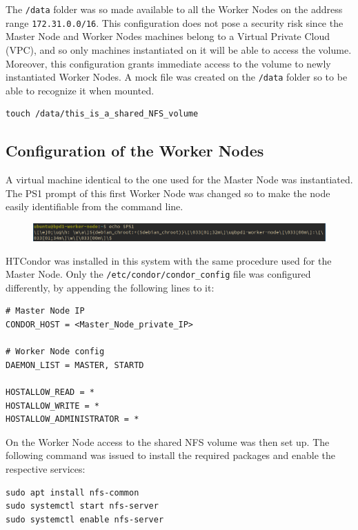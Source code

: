\documentclass{article}
\begin{document}
The \texttt{/data} folder was so made available to all the Worker Nodes on the address range \texttt{172.31.0.0/16}.
This configuration does not pose a security risk since the Master Node and Worker Nodes machines belong to a Virtual Private Cloud (VPC), and so only machines instantiated on it will be able to access the volume.
Moreover, this configuration grants immediate access to the volume to newly instantiated Worker Nodes.
A mock file was created on the \texttt{/data} folder so to be able to recognize it when mounted.

\begin{lstlisting}
touch /data/this_is_a_shared_NFS_volume
\end{lstlisting}

\subsection{Configuration of the Worker Nodes}
A virtual machine identical to the one used for the Master Node was instantiated.
The PS1 prompt of this first Worker Node was changed so to make the node easily identifiable from the command line.

\begin{figure}[!h]
    \center
    \includegraphics[width=\textwidth]{./images/worker-ps1.png}
\end{figure}

HTCondor was installed in this system with the same procedure used for the Master Node.
Only the \texttt{/etc/condor/condor\_config} file was configured differently, by appending the following lines to it:

\begin{lstlisting}
# Master Node IP
CONDOR_HOST = <Master_Node_private_IP>

# Worker Node config
DAEMON_LIST = MASTER, STARTD

HOSTALLOW_READ = *
HOSTALLOW_WRITE = *
HOSTALLOW_ADMINISTRATOR = *
\end{lstlisting}

On the Worker Node access to the shared NFS volume was then set up.
The following command was issued to install the required packages and enable the respective services:

\begin{lstlisting}
sudo apt install nfs-common
sudo systemctl start nfs-server
sudo systemctl enable nfs-server
\end{lstlisting}
\end{document}
